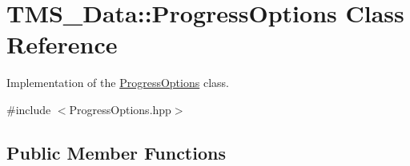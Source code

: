 \hypertarget{classTMS__Data_1_1ProgressOptions}{
\section{TMS\_\-Data::ProgressOptions Class Reference}
\label{classTMS__Data_1_1ProgressOptions}
}


Implementation of the \hyperlink{classTMS__Data_1_1ProgressOptions}{ProgressOptions} class.  




{\ttfamily \#include $<$ProgressOptions.hpp$>$}

\subsection*{Public Member Functions}
